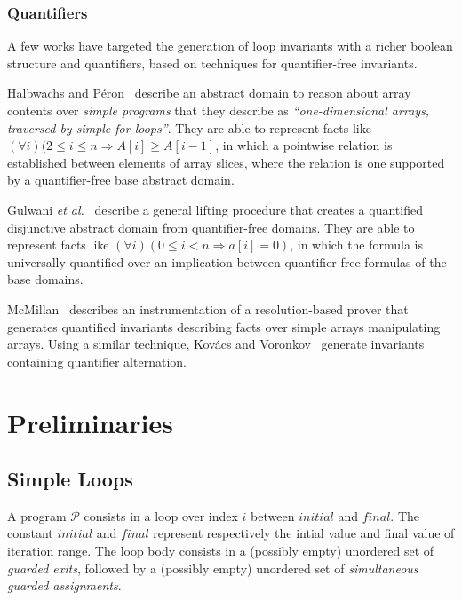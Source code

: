 \documentclass[a4paper,10pt]{article}
\newcommand{\etal}{\textit{et al.}\xspace}
\newcommand{\prog}{\ensuremath{\mathcal{P}}\xspace}
\newcommand{\idx}{\ensuremath{i}\xspace}
\newcommand{\idxinitial}{\ensuremath{\mathit{initial}}\xspace}
\newcommand{\idxfinal}{\ensuremath{\mathit{final}}\xspace}
\newcommand{\impl}{\ensuremath{\Longrightarrow}}
\begin{document}
\subsubsection*{Quantifiers}

A few works have targeted the generation of loop invariants with a richer
boolean structure and quantifiers, based on techniques for quantifier-free
invariants.

Halbwachs and Péron~\cite{halbwachs:2008:pldi} describe an abstract domain to
reason about array contents over \textit{simple programs} that they describe as
\textit{``one-dimensional arrays, traversed by simple for loops''}. They are
able to represent facts like $(\forall i)(2 \leq i \leq n \impl A[i] \geq
A[i−1]$, in which a pointwise relation is established between elements of array
slices, where the relation is one supported by a quantifier-free base abstract
domain.

Gulwani \etal~\cite{gulwani:2008:popl} describe a general lifting procedure
that creates a quantified disjunctive abstract domain from quantifier-free
domains. They are able to represent facts like $(\forall i)(0 \leq i < n \impl
a[i] = 0)$, in which the formula is universally quantified over an implication
between quantifier-free formulas of the base domains.

McMillan~\cite{mcmillan:2008:tacas} describes an instrumentation of a
resolution-based prover that generates quantified invariants describing facts
over simple arrays manipulating arrays. Using a similar technique, Kov\'acs and
Voronkov~\cite{kovacs:2009:fli} generate invariants containing quantifier
alternation.

\section{Preliminaries}

\subsection{Simple Loops}

A program \prog consists in a loop over index \idx between \idxinitial and \idxfinal. 
The constant \idxinitial and \idxfinal represent respectively the intial value and final
value of iteration range.
The loop body consists in a (possibly empty) unordered set of \textit{guarded exits},
followed by a (possibly empty) unordered set of \textit{simultaneous guarded assignments}.

\newcommand{\expr}{\ensuremath{\mathit{expr}}}
\newcommand{\assign}{\ensuremath{\mathit{assign}}}
\newcommand{\gexit}{\ensuremath{\mathit{guardexit}}}
\newcommand{\gassign}{\ensuremath{\mathit{guardassign}}}
\newcommand{\location}{\ensuremath{\mathit{location}}}
\end{document}
